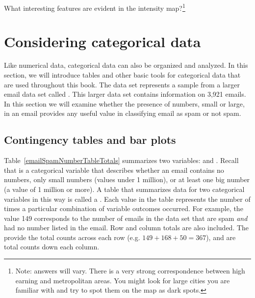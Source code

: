 \begin{exercise}
What interesting features are evident in the  intensity map?\footnote{Note: answers will vary. There is a very strong correspondence between high earning and metropolitan areas. You might look for large cities you are familiar with and try to spot them on the map as dark spots.}
\end{exercise}



\section[Considering categorical data]{Considering categorical data }
\label{categoricalData}


Like numerical data, categorical data can also be organized and analyzed. In this section, we will introduce tables and other basic tools for categorical data that are used throughout this book. The  data set represents a sample from a larger email data set called . This larger data set contains information on 3,921 emails. In this section we will examine whether the presence of numbers, small or large, in an email provides any useful value in classifying email as spam or not spam.

\subsection{Contingency tables and bar plots}

Table~\ref{emailSpamNumberTableTotals} summarizes two variables:  and . Recall that  is a categorical variable that describes whether an email contains no numbers, only small numbers (values under 1 million), or at least one big number (a value of 1 million or more). A table that summarizes data for two categorical variables in this way is called a . Each value in the table represents the number of times a particular combination of variable outcomes occurred. For example, the value 149 corresponds to the number of emails in the data set that are spam \emph{and} had no number listed in the email. Row and column totals are also included. The   provide the total counts across each row (e.g. $149 + 168 + 50 = 367$), and   are total counts down each column.

